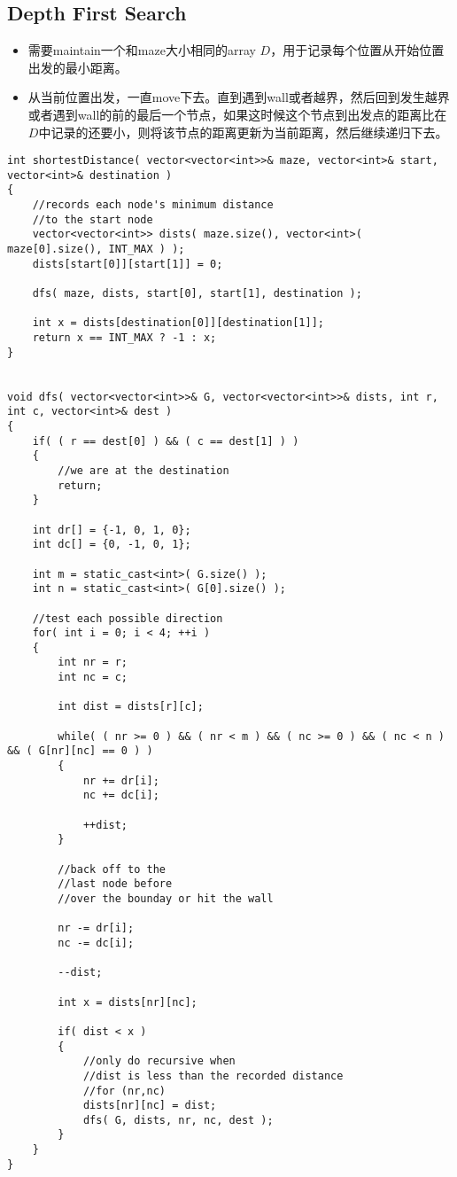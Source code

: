 \subsection{Depth First Search}
\begin{itemize}
\item 需要maintain一个和maze大小相同的array $D$，用于记录每个位置从开始位置出发的最小距离。
\item 从当前位置出发，一直move下去。直到遇到wall或者越界，然后回到发生越界或者遇到wall的前的最后一个节点，如果这时候这个节点到出发点的距离比在$D$中记录的还要小，则将该节点的距离更新为当前距离，然后继续递归下去。
\end{itemize}

\setcounter{lstlisting}{0}
\begin{lstlisting}[style=customc, caption={DFS}]
int shortestDistance( vector<vector<int>>& maze, vector<int>& start, vector<int>& destination )
{
    //records each node's minimum distance
    //to the start node
    vector<vector<int>> dists( maze.size(), vector<int>( maze[0].size(), INT_MAX ) );
    dists[start[0]][start[1]] = 0;

    dfs( maze, dists, start[0], start[1], destination );

    int x = dists[destination[0]][destination[1]];
    return x == INT_MAX ? -1 : x;
}


void dfs( vector<vector<int>>& G, vector<vector<int>>& dists, int r, int c, vector<int>& dest )
{
    if( ( r == dest[0] ) && ( c == dest[1] ) )
    {
        //we are at the destination
        return;
    }

    int dr[] = {-1, 0, 1, 0};
    int dc[] = {0, -1, 0, 1};

    int m = static_cast<int>( G.size() );
    int n = static_cast<int>( G[0].size() );

    //test each possible direction
    for( int i = 0; i < 4; ++i )
    {
        int nr = r;
        int nc = c;

        int dist = dists[r][c];

        while( ( nr >= 0 ) && ( nr < m ) && ( nc >= 0 ) && ( nc < n ) && ( G[nr][nc] == 0 ) )
        {
            nr += dr[i];
            nc += dc[i];

            ++dist;
        }

        //back off to the
        //last node before
        //over the bounday or hit the wall

        nr -= dr[i];
        nc -= dc[i];

        --dist;

        int x = dists[nr][nc];

        if( dist < x )
        {
            //only do recursive when
            //dist is less than the recorded distance
            //for (nr,nc)
            dists[nr][nc] = dist;
            dfs( G, dists, nr, nc, dest );
        }
    }
}
\end{lstlisting}

